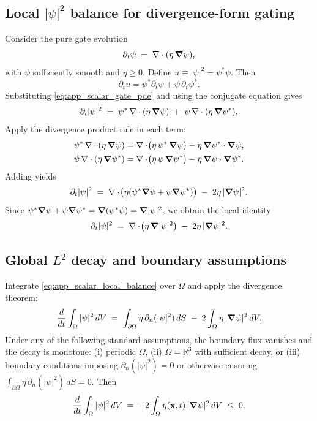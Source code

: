 \documentclass[11pt]{article}
\theoremstyle{plain}
\theoremstyle{definition}
\theoremstyle{remark}
\newcommand{\R}{\mathbb{R}}
\newcommand{\diver}{\nabla\cdot}
\begin{document}
\subsection{Local $|\psi|^2$ balance for divergence-form gating}
Consider the pure gate evolution
\begin{equation}\label{eq:app_scalar_gate_pde}
  \partial_t\psi \;=\; \diver(\eta\,\grad\psi),
\end{equation}
with $\psi$ sufficiently smooth and $\eta\ge 0$. Define $u\equiv|\psi|^2=\psi^*\psi$. Then
\[
\partial_t u = \psi^*\partial_t\psi + \psi\,\partial_t\psi^*.
\]
Substituting \eqref{eq:app_scalar_gate_pde} and using the conjugate equation gives
\begin{equation}\label{eq:app_scalar_u_start}
  \partial_t|\psi|^2
  \;=\;
  \psi^*\,\diver(\eta\,\grad\psi)
  \;+\;
  \psi\,\diver(\eta\,\grad\psi^*).
\end{equation}
Apply the divergence product rule in each term:
\begin{align}
  \psi^*\,\diver(\eta\,\grad\psi)
  &= \diver\!\big(\eta\,\psi^*\,\grad\psi\big) - \eta\,\grad\psi^*\cdot\grad\psi,\\
  \psi\,\diver(\eta\,\grad\psi^*)
  &= \diver\!\big(\eta\,\psi\,\grad\psi^*\big) - \eta\,\grad\psi\cdot\grad\psi^*.
\end{align}
Adding yields
\begin{equation}\label{eq:app_scalar_local_balance_mid}
  \partial_t|\psi|^2
  \;=\;
  \diver\!\big(\eta(\psi^*\grad\psi+\psi\grad\psi^*)\big)
  \;-\;
  2\eta\,|\grad\psi|^2.
\end{equation}
Since $\psi^*\grad\psi+\psi\grad\psi^*=\grad(\psi^*\psi)=\grad|\psi|^2$, we obtain the local identity
\begin{equation}\label{eq:app_scalar_local_balance}
  \partial_t|\psi|^2
  \;=\;
  \diver\!\big(\eta\,\grad|\psi|^2\big)
  \;-\;
  2\eta\,|\grad\psi|^2.
\end{equation}

\subsection{Global $L^2$ decay and boundary assumptions}
Integrate \eqref{eq:app_scalar_local_balance} over $\Omega$ and apply the divergence theorem:
\begin{equation}\label{eq:app_scalar_global_balance}
  \frac{d}{dt}\int_{\Omega}|\psi|^2\,dV
  \;=\;
  \int_{\partial\Omega}\eta\,\partial_n(|\psi|^2)\,dS
  \;-\;
  2\int_{\Omega}\eta\,|\grad\psi|^2\,dV.
\end{equation}
Under any of the following standard assumptions, the boundary flux vanishes and the decay is monotone:
(i) periodic $\Omega$, (ii) $\Omega=\R^3$ with sufficient decay, or (iii) boundary conditions imposing
$\partial_n(|\psi|^2)=0$ or otherwise ensuring $\int_{\partial\Omega}\eta\,\partial_n(|\psi|^2)\,dS=0$.
Then
\begin{equation}\label{eq:app_scalar_monotone_decay}
  \frac{d}{dt}\int_{\Omega}|\psi|^2\,dV
  \;=\;
  -2\int_{\Omega}\eta(\mathbf{x},t)\,|\grad\psi|^2\,dV
  \;\le\; 0.
\end{equation}
\end{document}
